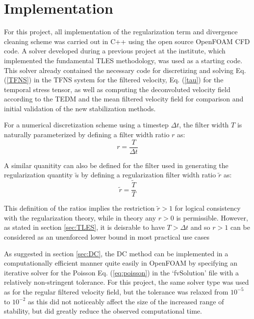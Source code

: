 \chapter{Implementation} \label{chap:Imp}


For this project, all implementation of the regularization term and divergence cleaning scheme was carried out in C++ using the open source OpenFOAM CFD code. A solver developed during a previous project at the institute, which implemented the fundamental TLES methodology, was used as a starting code. This solver already contained the necessary code for discretizing and solving Eq. (\ref{TFNS}) in the TFNS system for the filtered velocity, Eq. (\ref{tau}) for the temporal stress tensor, as well as computing the deconvoluted velocity field according to the TEDM and the mean filtered velocity field for comparison and initial validation of the new stabilization methods.

For a numerical discretization scheme using a timestep $\Delta t$, the filter width $T$ is naturally parameterized by defining a filter width ratio $r$ as:
\begin{equation} \label{r}
r=\frac{T}{\Delta t}
\end{equation}

A similar quanitity can also be defined for the filter used in generating the regularization quantity $\tilde{u}$ by defining a regularization filter width ratio $\tilde{r}$ as:
\begin{equation}
\tilde{r}=\frac{\tilde{T}}{T}
\end{equation}

This definition of the ratios implies the restriction $\tilde{r}>1$ for logical consistency with the regularization theory, while in theory any $r>0$ is permissible. However, as stated in section \ref{sec:TLES}, it is deisrable to have $T>\Delta t$ and so $r>1$ can be considered as an unenforced lower bound in most practical use cases

As suggested in section \ref{sec:DC}, the DC method can be implemented in a computationally efficient manner quite easily in OpenFOAM by specifying an iterative solver for the Poisson Eq. (\ref{eq:poisson}) in the `fvSolution' file with a relatively non-stringent tolerance. For this project, the same solver type was used as for the regular filtered velocity field, but the tolerance was relaxed from $10^{-5}$ to $10^{-2}$ as this did not noticeably affect the size of the increased range of stability, but did greatly reduce the observed computational time.
